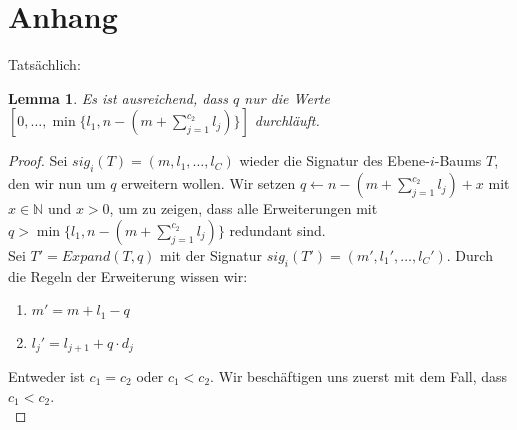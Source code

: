 \documentclass[a4paper,10pt,ngerman]{scrartcl}
\newtheorem{lemma}[satz]{Lemma}
\begin{document}
    \section{Anhang}
    Tatsächlich:
    \begin{lemma}
        \label{lem:reader_2}
        Es ist ausreichend, dass $q$ nur die Werte $[0, \dots, \min\{l_1, n - (m + \sum^{c_2}_{j=1} l_j)\}]$ durchläuft.
    \end{lemma}
    \begin{proof}
        Sei $sig_i(T) = (m, l_1, \dots, l_C)$ wieder die Signatur des Ebene-$i$-Baums $T$, den wir nun um $q$ erweitern wollen.
        Wir setzen $q \gets n - (m + \sum^{c_2}_{j=1} l_j) + x$ mit $x \in \mathbb N$ und $x > 0$, um zu zeigen, dass alle Erweiterungen mit $q > \min\{l_1, n - (m + \sum^{c_2}_{j=1} l_j)\}$ redundant sind. \\
        Sei $T' = Expand(T, q)$ mit der Signatur $sig_i(T') = (m', l_1', \dots, l_C')$.
        Durch die Regeln der Erweiterung wissen wir:
        \begin{enumerate}
            \item $m' = m + l_1 - q$
            \item $l_j' = l_{j+1} + q \cdot d_j$
        \end{enumerate}
        Entweder ist $c_1 = c_2$ oder $c_1 < c_2$.
        Wir beschäftigen uns zuerst mit dem Fall, dass $c_1 < c_2$. \\


\end{proof}
\end{document}
